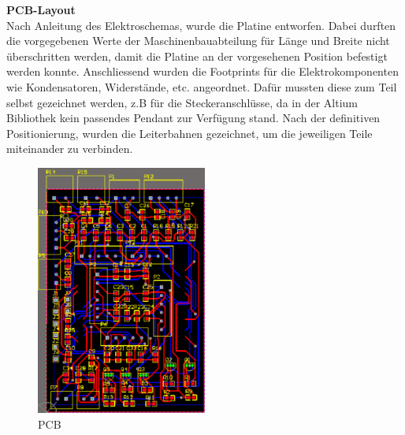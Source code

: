 \textbf{PCB-Layout}
\\[0.2cm]
Nach Anleitung des Elektroschemas, wurde die Platine entworfen. Dabei durften die vorgegebenen Werte der Maschinenbauabteilung für Länge und Breite nicht überschritten werden, damit die Platine an der vorgesehenen Position befestigt werden konnte. Anschliessend wurden die Footprints für die Elektrokomponenten wie Kondensatoren, Widerstände, etc. angeordnet. Dafür mussten diese zum Teil selbst gezeichnet werden, z.B für die Steckeranschlüsse, da in der Altium Bibliothek kein passendes Pendant zur Verfügung stand.
Nach der definitiven Positionierung, wurden die Leiterbahnen gezeichnet, um die jeweiligen Teile miteinander zu verbinden.
\\[0.2cm]
\begin{figure}[H]
\centering
\includegraphics[width=0.5\textwidth]{03_Loesungskonzept/pictures/pcb_print.png}
\caption{PCB}	
\end{figure}
